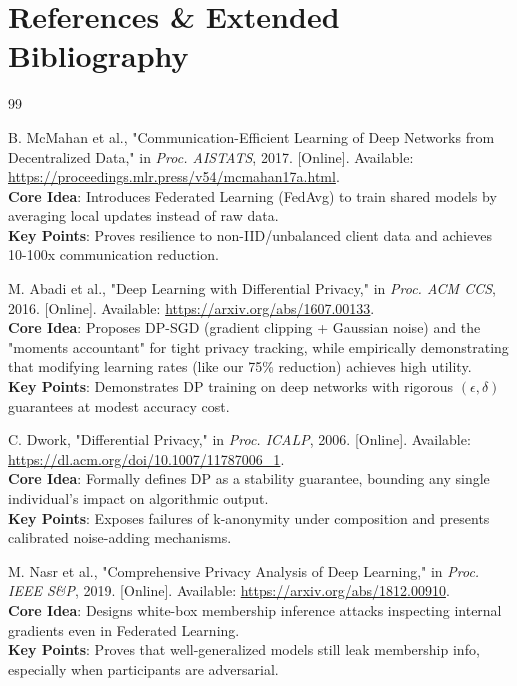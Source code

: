 \documentclass[10pt, a4paper, twocolumn]{article}
\begin{document}
\section*{References \& Extended Bibliography}
\begin{thebibliography}{99}

 B. McMahan et al., "Communication-Efficient Learning of Deep Networks from Decentralized Data," in \textit{Proc. AISTATS}, 2017. [Online]. Available: \url{https://proceedings.mlr.press/v54/mcmahan17a.html}. \\
\textbf{Core Idea}: Introduces Federated Learning (FedAvg) to train shared models by averaging local updates instead of raw data. \\
\textbf{Key Points}: Proves resilience to non-IID/unbalanced client data and achieves 10-100x communication reduction.

 M. Abadi et al., "Deep Learning with Differential Privacy," in \textit{Proc. ACM CCS}, 2016. [Online]. Available: \url{https://arxiv.org/abs/1607.00133}. \\
\textbf{Core Idea}: Proposes DP-SGD (gradient clipping + Gaussian noise) and the "moments accountant" for tight privacy tracking, while empirically demonstrating that modifying learning rates (like our 75\% reduction) achieves high utility. \\
\textbf{Key Points}: Demonstrates DP training on deep networks with rigorous $(\epsilon, \delta)$ guarantees at modest accuracy cost.

 C. Dwork, "Differential Privacy," in \textit{Proc. ICALP}, 2006. [Online]. Available: \url{https://dl.acm.org/doi/10.1007/11787006_1}. \\
\textbf{Core Idea}: Formally defines DP as a stability guarantee, bounding any single individual's impact on algorithmic output. \\
\textbf{Key Points}: Exposes failures of k-anonymity under composition and presents calibrated noise-adding mechanisms.

 M. Nasr et al., "Comprehensive Privacy Analysis of Deep Learning," in \textit{Proc. IEEE S\&P}, 2019. [Online]. Available: \url{https://arxiv.org/abs/1812.00910}. \\
\textbf{Core Idea}: Designs white-box membership inference attacks inspecting internal gradients even in Federated Learning. \\
\textbf{Key Points}: Proves that well-generalized models still leak membership info, especially when participants are adversarial.


\end{thebibliography}
\end{document}
